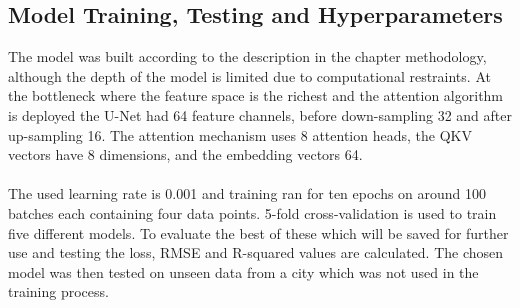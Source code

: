 \subsection{Model Training, Testing and Hyperparameters}
The model was built according to the description in the chapter methodology, although the depth of the model is limited due to computational restraints. 
At the bottleneck where the feature space is the richest and the attention algorithm is deployed the U-Net had 64 feature channels, before down-sampling 32 and after up-sampling 16.
The attention mechanism uses 8 attention heads, the QKV vectors have 8 dimensions, and the embedding vectors 64.\\
\\
The used learning rate is 0.001 and training ran for ten epochs on around 100 batches each containing four data points.
5-fold cross-validation is used to train five different models. 
To evaluate the best of these which will be saved for further use and testing the loss, RMSE and R-squared values are calculated. 
The chosen model was then tested on unseen data from a city which was not used in the training process.